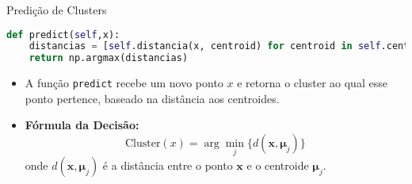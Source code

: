 \documentclass{beamer}
\begin{document}
\begin{frame}[fragile]{Predição de Clusters}
\begin{lstlisting}[language=Python]
def predict(self,x):
    distancias = [self.distancia(x, centroid) for centroid in self.centroids]
    return np.argmax(distancias)
\end{lstlisting}
    \vspace{0.3cm}
    \begin{itemize}
        \item A função \texttt{predict} recebe um novo ponto \( x \) e retorna o cluster ao qual esse ponto pertence, baseado na distância aos centroides.
    \end{itemize}
    \vspace{0.3cm}
    \begin{itemize}
        \item \textbf{Fórmula da Decisão:}
        \[
        \text{Cluster}(x) = \arg\min_{j} \{d(\mathbf{x}, \mathbf{\mu}_j)\}
        \]
        onde \( d(\mathbf{x}, \mathbf{\mu}_j) \) é a distância entre o ponto \( \mathbf{x} \) e o centroide \( \mathbf{\mu}_j \).
    \end{itemize}
\end{frame}


\end{document}
